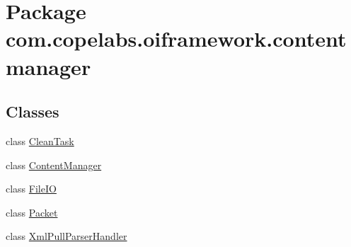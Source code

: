 \hypertarget{namespacecom_1_1copelabs_1_1oiframework_1_1contentmanager}{}\section{Package com.\+copelabs.\+oiframework.\+contentmanager}
\label{namespacecom_1_1copelabs_1_1oiframework_1_1contentmanager}
\subsection*{Classes}
\begin{DoxyCompactItemize}
\item 
class \hyperlink{classcom_1_1copelabs_1_1oiframework_1_1contentmanager_1_1_clean_task}{Clean\+Task}
\item 
class \hyperlink{classcom_1_1copelabs_1_1oiframework_1_1contentmanager_1_1_content_manager}{Content\+Manager}
\item 
class \hyperlink{classcom_1_1copelabs_1_1oiframework_1_1contentmanager_1_1_file_i_o}{File\+I\+O}
\item 
class \hyperlink{classcom_1_1copelabs_1_1oiframework_1_1contentmanager_1_1_packet}{Packet}
\item 
class \hyperlink{classcom_1_1copelabs_1_1oiframework_1_1contentmanager_1_1_xml_pull_parser_handler}{Xml\+Pull\+Parser\+Handler}
\end{DoxyCompactItemize}
